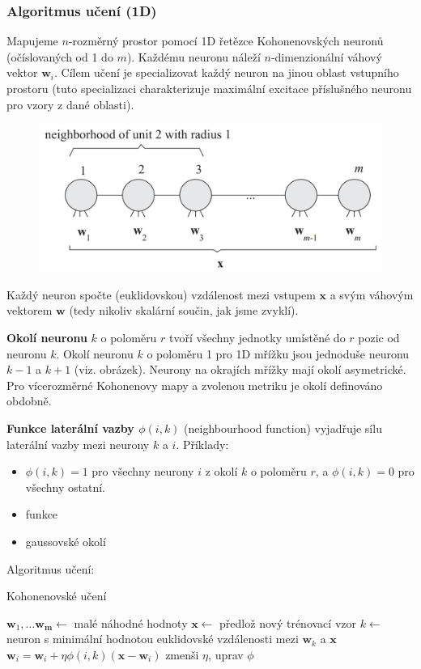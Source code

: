 \documentclass[11pt]{report} %
\renewcommand{\vec}[1]{\mathbf{#1}}
\numberwithin{equation}{section}
\begin{document}
\subsubsection{Algoritmus učení (1D)}
Mapujeme $n$-rozměrný prostor pomocí 1D řetězce Kohonenovských neuronů (očíslovaných od 1 do $m$). Každému neuronu náleží $n$-dimenzionální váhový vektor $\vec{w}_i$. Cílem učení je specializovat každý neuron na jinou oblast vstupního prostoru (tuto specializaci charakterizuje maximální excitace příslušného neuronu pro vzory z dané oblasti).

\begin{figure}[h]
	\centering
	\includegraphics[scale=0.7]{img/kohonen1d.png}
\end{figure}

Každý neuron spočte (euklidovskou) vzdálenost mezi vstupem $\vec{x}$ a svým váhovým vektorem $\vec{w}$ (tedy nikoliv skalární součin, jak jsme zvyklí).

\textbf{Okolí neuronu} $k$ o poloměru $r$ tvoří všechny jednotky umístěné do $r$ pozic od neuronu $k$. Okolí neuronu $k$ o poloměru 1 pro 1D mřížku jsou jednoduše neuronu $k-1$ a $k+1$ (viz. obrázek). Neurony na okrajích mřížky mají okolí asymetrické. Pro vícerozměrné Kohonenovy mapy a zvolenou metriku je okolí definováno obdobně.

\textbf{Funkce laterální vazby $\phi(i,k)$} (neighbourhood function) vyjadřuje sílu laterální vazby mezi neurony $k$ a $i$. Příklady:
\begin{itemize}
	\item $\phi(i,k) = 1$ pro všechny neurony $i$ z okolí $k$ o poloměru $r$, a $\phi(i,k) = 0$ pro všechny ostatní.
	\item funkce 
	\item gaussovské okolí
\end{itemize}

Algoritmus učení:
\bigskip
\begin{algorithm}[H]
	\caption{Kohonenovské učení}
	\begin{algorithmic}[1]
			\State $\vec{w}_1, \dots \vec{w_m} \gets $ malé náhodné hodnoty
				\State $\vec{x} \gets $ předlož nový trénovací vzor
				\State $k \gets$ neuron s minimální hodnotou euklidovské vzdálenosti mezi $\vec{w}_k$ a $\vec{x}$
					\State $\vec{w}_i = \vec{w}_i + \eta\phi(i,k)(\vec{x} - \vec{w}_i)$
				\EndFor
				\State zmenši $\eta$, uprav $\phi$
			\EndWhile
		\EndFunction
	\end{algorithmic}
\end{algorithm}	
\end{document}
